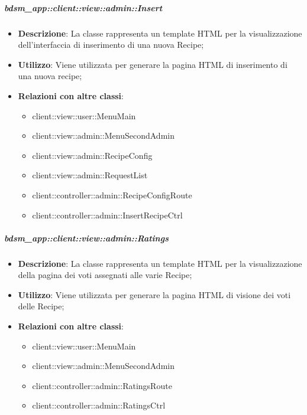 		\subparagraph{bdsm\_app::client::view::admin::Insert} %
		\label{subp:bdsm_app_client_view_admin_insert}
			\begin{itemize}
				\item \textbf{Descrizione}: La classe rappresenta un template HTML per la visualizzazione dell'interfaccia di inserimento di una nuova Recipe;
				\item \textbf{Utilizzo}: Viene utilizzata per generare la pagina HTML di inserimento di una nuova recipe;
				\item \textbf{Relazioni con altre classi}:
					\begin{itemize}
						\item client::view::user::MenuMain
						\item client::view::admin::MenuSecondAdmin
						\item client::view::admin::RecipeConfig
						\item client::view::admin::RequestList
						\item client::controller::admin::RecipeConfigRoute
						\item client::controller::admin::InsertRecipeCtrl
					\end{itemize}
			\end{itemize}

		\subparagraph{bdsm\_app::client::view::admin::Ratings} %
		\label{subp:bdsm_app_client_view_admin_ratings}
			\begin{itemize}
				\item \textbf{Descrizione}: La classe rappresenta un template HTML per la visualizzazione della pagina dei voti assegnati alle varie Recipe;
				\item \textbf{Utilizzo}: Viene utilizzata per generare la pagina HTML di visione dei voti delle Recipe;
				\item \textbf{Relazioni con altre classi}:
					\begin{itemize}
						\item client::view::user::MenuMain
						\item client::view::admin::MenuSecondAdmin
						\item client::controller::admin::RatingsRoute
						\item client::controller::admin::RatingsCtrl
					\end{itemize}
			\end{itemize}

